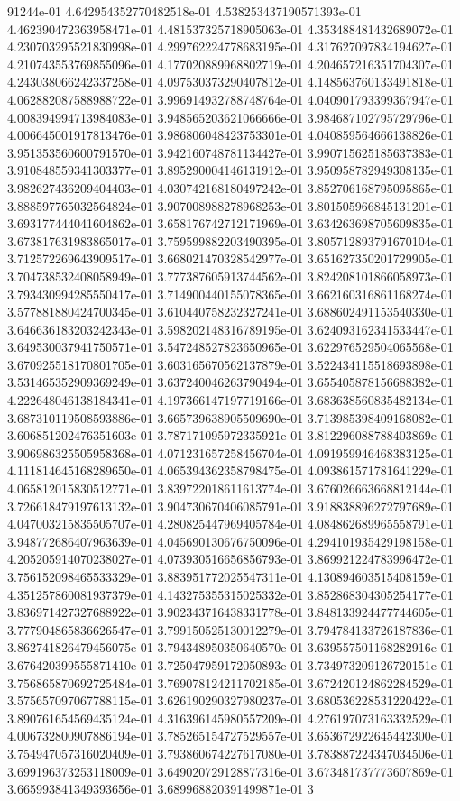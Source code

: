 91244e-01	4.642954352770482518e-01	4.538253437190571393e-01	4.462390472363958471e-01	4.481537325718905063e-01	4.353488481432689072e-01	4.230703295521830998e-01	4.299762224778683195e-01	4.317627097834194627e-01	4.210743553769855096e-01	4.177020889968802719e-01	4.204657216351704307e-01	4.243038066242337258e-01	4.097530373290407812e-01	4.148563760133491818e-01	4.062882087588988722e-01	3.996914932788748764e-01	4.040901793399367947e-01	4.008394994713984083e-01	3.948565203621066666e-01	3.984687102795729796e-01	4.006645001917813476e-01	3.986806048423753301e-01	4.040859564666138826e-01	3.951353560600791570e-01	3.942160748781134427e-01	3.990715625185637383e-01	3.910848559341303377e-01	3.895290004146131912e-01	3.950958782949308135e-01	3.982627436209404403e-01	4.030742168180497242e-01	3.852706168795095865e-01	3.888597765032564824e-01	3.907008988278968253e-01	3.801505966845131201e-01	3.693177444041604862e-01	3.658176742712171969e-01	3.634263698705609835e-01	3.673817631983865017e-01	3.759599882203490395e-01	3.805712893791670104e-01	3.712572269643909517e-01	3.668021470328542977e-01	3.651627350201729905e-01	3.704738532408058949e-01	3.777387605913744562e-01	3.824208101866058973e-01	3.793430994285550417e-01	3.714900440155078365e-01	3.662160316861168274e-01	3.577881880424700345e-01	3.610440758232327241e-01	3.688602491153540330e-01	3.646636183203242343e-01	3.598202148316789195e-01	3.624093162341533447e-01	3.649530037941750571e-01	3.547248527823650965e-01	3.622976529504065568e-01	3.670925518170801705e-01	3.603165670562137879e-01	3.522434115518693898e-01	3.531465352909369249e-01	3.637240046263790494e-01	3.655405878156688382e-01	4.222648046138184341e-01	4.197366147197719166e-01	3.683638560835482134e-01	3.687310119508593886e-01	3.665739638905509690e-01	3.713985398409168082e-01	3.606851202476351603e-01	3.787171095972335921e-01	3.812296088788403869e-01	3.906986325505958368e-01	4.071231657258456704e-01	4.091959946468383125e-01	4.111814645168289650e-01	4.065394362358798475e-01	4.093861571781641229e-01	4.065812015830512771e-01	3.839722018611613774e-01	3.676026663668812144e-01	3.726618479197613132e-01	3.904730670406085791e-01	3.918838896272797689e-01	4.047003215835505707e-01	4.280825447969405784e-01	4.084862689965558791e-01	3.948772686407963639e-01	4.045690130676750096e-01	4.294101935429198158e-01	4.205205914070238027e-01	4.073930516656856793e-01	3.869921224783996472e-01	3.756152098465533329e-01	3.883951772025547311e-01	4.130894603515408159e-01	4.351257860081937379e-01	4.143275355315025332e-01	3.852868304305254177e-01	3.836971427327688922e-01	3.902343716438331778e-01	3.848133924477744605e-01	3.777904865836626547e-01	3.799150525130012279e-01	3.794784133726187836e-01	3.862741826479456075e-01	3.794348950350640570e-01	3.639557501168282916e-01	3.676420399555871410e-01	3.725047959172050893e-01	3.734973209126720151e-01	3.756865870692725484e-01	3.769078124211702185e-01	3.672420124862284529e-01	3.575657097067788115e-01	3.626190290327980237e-01	3.680536228531220422e-01	3.890761654569435124e-01	4.316396145980557209e-01	4.276197073163332529e-01	4.006732800907886194e-01	3.785265154727529557e-01	3.653672922645442300e-01	3.754947057316020409e-01	3.793860674227617080e-01	3.783887224347034506e-01	3.699196373253118009e-01	3.649020729128877316e-01	3.673481737773607869e-01	3.665993841349393656e-01	3.689968820391499871e-01	3
